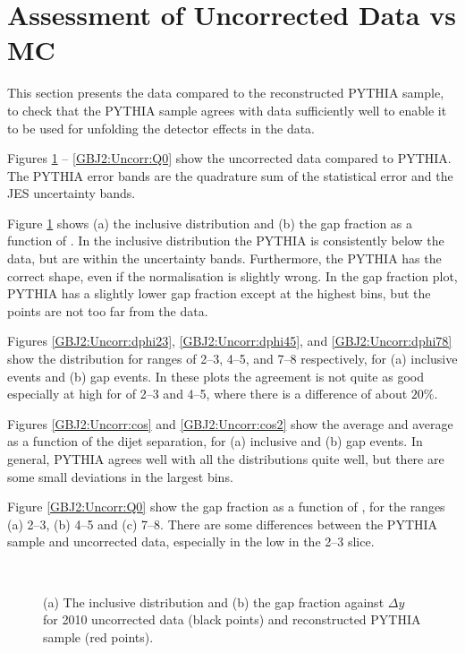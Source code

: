 \section{Assessment of Uncorrected Data vs MC}
\label{sec:GBJ2:Uncorr}
This section presents the data compared to the reconstructed PYTHIA sample, to check that the PYTHIA sample agrees with data sufficiently well to enable it to be used for unfolding the detector effects in the data.

Figures \ref{GBJ2:Uncorr:Incl_Gap} -- \ref{GBJ2:Uncorr:Q0} show the uncorrected data compared to PYTHIA.
The PYTHIA error bands are the quadrature sum of the statistical error and the JES uncertainty bands. 

Figure \ref{GBJ2:Uncorr:Incl_Gap} shows (a) the inclusive distribution and (b) the gap fraction as a function of \dy{}.
In the inclusive distribution the PYTHIA is consistently below the data, but are within the uncertainty bands.
Furthermore, the PYTHIA has the correct shape, even if the normalisation is slightly wrong.
In the gap fraction plot, PYTHIA has a slightly lower gap fraction except at the highest \dy{} bins, but the points are not too far from the data.

Figures \ref{GBJ2:Uncorr:dphi23}, \ref{GBJ2:Uncorr:dphi45}, and \ref{GBJ2:Uncorr:dphi78} show the \dphi{} distribution for \dy{} ranges of 2--3, 4--5, and 7--8 respectively, for (a) inclusive events and (b) gap events.
In these \dphi{} plots the agreement is not quite as good especially at high \dphi{} for \dy{} of 2--3 and 4--5, where there is a difference of about $20\%$. 

Figures \ref{GBJ2:Uncorr:cos} and \ref{GBJ2:Uncorr:cos2} show the average \cosdphi{} and average \costwodphi{} as a function of the dijet separation, \dy{} for (a) inclusive and (b) gap events.
In general, PYTHIA agrees well with all the distributions quite well, but there are some small deviations in the largest \dy{} bins. 

Figure \ref{GBJ2:Uncorr:Q0} show the gap fraction as a function of \qz{}, for the \dy{} ranges (a) 2--3, (b) 4--5 and (c) 7--8.
There are some differences between the PYTHIA sample and uncorrected data, especially in the low \qz{} in the 2--3 \dy{} slice.


\begin{figure}
\centering
\mbox{
              \quad
              \quad
                              }
\caption[]{
(a) The inclusive distribution and (b) the gap fraction against $\Delta y$ for 2010 uncorrected data (black points) and reconstructed PYTHIA sample (red points).
\label{GBJ2:Uncorr:Incl_Gap}}
\end{figure}



